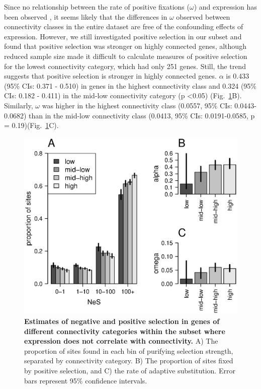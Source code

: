 Since no relationship between the rate of positive fixations ($\omega$) and expression has been observed \citep{Williamson2014-tf}, it seems likely that the differences in $\omega$ observed between connectivity classes in the entire dataset are free of the confounding effects of expression. However, we still investigated positive selection in our subset and found that positive selection was stronger on highly connected genes, although reduced sample size made it difficult to calculate measures of positive selection for the lowest connectivity category, which had only 251 genes. Still, the trend suggests that positive selection is stronger in highly connected genes. $\alpha$ is 0.433 (95\% CIs: 0.371 - 0.510) in genes in the highest connectivity class and 0.324 (95\% CIs: 0.182 - 0.411) in the mid-low connectivity category (p \textless 0.05) (Fig.~\ref{fig:f3}B). Similarly, $\omega$ was higher in the highest connectivity class (0.0557, 95\% CIs: 0.0443-0.0682) than in the mid-low connectivity class (0.0413, 95\% CIs: 0.0191-0.0585, p = 0.19)(Fig.~\ref{fig:f3}C). 


\begin{figure}[ht!]
\centering
\includegraphics[width=\linewidth]{Ch4Fig3}
\caption{\textbf{Estimates of negative and positive selection in genes of different connectivity categories within the subset where expression does not correlate with connectivity.} A) The proportion of sites found in each bin of purifying selection strength, separated by connectivity category. B) The proportion of sites fixed by positive selection, and C) the rate of adaptive substitution. Error bars represent 95\% confidence intervals.}
\label{fig:f3}
\end{figure}


